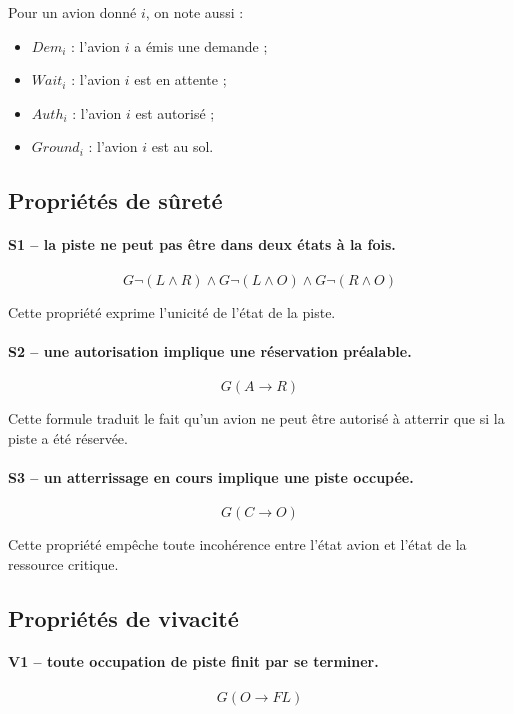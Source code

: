 \documentclass[11pt,a4paper]{article}
\begin{document}
Pour un avion donné $i$, on note aussi :
\begin{itemize}
    \item $Dem_i$ : l'avion $i$ a émis une demande ;
    \item $Wait_i$ : l'avion $i$ est en attente ;
    \item $Auth_i$ : l'avion $i$ est autorisé ;
    \item $Ground_i$ : l'avion $i$ est au sol.
\end{itemize}

\subsection{Propriétés de sûreté}

\paragraph{S1 -- la piste ne peut pas être dans deux états à la fois.}
\[
G\neg(L \land R) \land G\neg(L \land O) \land G\neg(R \land O)
\]

Cette propriété exprime l'unicité de l'état de la piste.

\paragraph{S2 -- une autorisation implique une réservation préalable.}
\[
G(A \rightarrow R)
\]

Cette formule traduit le fait qu'un avion ne peut être autorisé à atterrir que si la piste a été réservée.

\paragraph{S3 -- un atterrissage en cours implique une piste occupée.}
\[
G(C \rightarrow O)
\]

Cette propriété empêche toute incohérence entre l'état avion et l'état de la ressource critique.

\subsection{Propriétés de vivacité}

\paragraph{V1 -- toute occupation de piste finit par se terminer.}
\[
G(O \rightarrow F L)
\]
\end{document}
